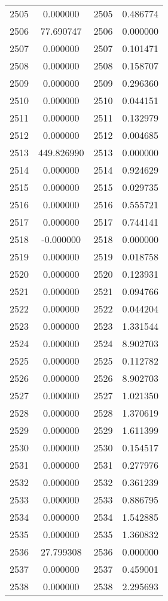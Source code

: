 \documentclass[12pt]{article}
\begin{document}
\begin{longtable}{@{}cccc@{}}
2505 & 0.000000 & 2505 & 0.486774 \\
2506 & 77.690747 & 2506 & 0.000000 \\
2507 & 0.000000 & 2507 & 0.101471 \\
2508 & 0.000000 & 2508 & 0.158707 \\
2509 & 0.000000 & 2509 & 0.296360 \\
2510 & 0.000000 & 2510 & 0.044151 \\
2511 & 0.000000 & 2511 & 0.132979 \\
2512 & 0.000000 & 2512 & 0.004685 \\
2513 & 449.826990 & 2513 & 0.000000 \\
2514 & 0.000000 & 2514 & 0.924629 \\
2515 & 0.000000 & 2515 & 0.029735 \\
2516 & 0.000000 & 2516 & 0.555721 \\
2517 & 0.000000 & 2517 & 0.744141 \\
2518 & -0.000000 & 2518 & 0.000000 \\
2519 & 0.000000 & 2519 & 0.018758 \\
2520 & 0.000000 & 2520 & 0.123931 \\
2521 & 0.000000 & 2521 & 0.094766 \\
2522 & 0.000000 & 2522 & 0.044204 \\
2523 & 0.000000 & 2523 & 1.331544 \\
2524 & 0.000000 & 2524 & 8.902703 \\
2525 & 0.000000 & 2525 & 0.112782 \\
2526 & 0.000000 & 2526 & 8.902703 \\
2527 & 0.000000 & 2527 & 1.021350 \\
2528 & 0.000000 & 2528 & 1.370619 \\
2529 & 0.000000 & 2529 & 1.611399 \\
2530 & 0.000000 & 2530 & 0.154517 \\
2531 & 0.000000 & 2531 & 0.277976 \\
2532 & 0.000000 & 2532 & 0.361239 \\
2533 & 0.000000 & 2533 & 0.886795 \\
2534 & 0.000000 & 2534 & 1.542885 \\
2535 & 0.000000 & 2535 & 1.360832 \\
2536 & 27.799308 & 2536 & 0.000000 \\
2537 & 0.000000 & 2537 & 0.459001 \\
2538 & 0.000000 & 2538 & 2.295693 \\

\end{longtable}
\end{document}
